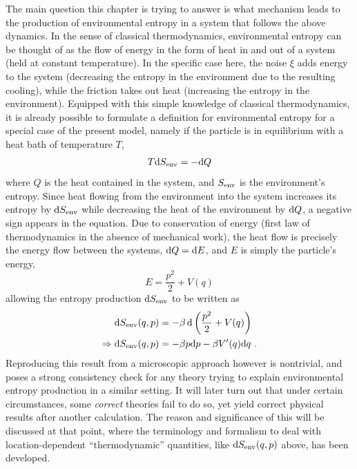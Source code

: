 The main question this chapter is trying to answer is what mechanism leads to the production of environmental entropy in a system that follows the above dynamics. In the sense of classical thermodynamics, environmental entropy can be thought of as the flow of energy in the form of heat in and out of a system (held at constant temperature). In the specific case here, the noise \(\xi\) adds energy to the system (decreasing the entropy in the environment due to the resulting cooling), while the friction takes out heat (increasing the entropy in the environment). Equipped with this simple knowledge of classical thermodynamics, it is already possible to formulate a definition for environmental entropy for a special case of the present model, namely if the particle is in equilibrium with a heat bath of temperature \(T\),
%
\begin{equation} T\mathrm{d}S_\text{env} = -\mathrm{d} Q \end{equation}
%
where \(Q\) is the heat contained in the system, and \(S_\text{env}\) is the environment's entropy. Since heat flowing from the environment into the system increases its entropy by \(\mathrm{d}S_\text{env}\) while decreasing the heat of the environment by \(\mathrm{d} Q\), a negative sign appears in the equation. Due to conservation of energy (first law of thermodynamics in the absence of mechanical work), the heat flow is precisely the energy flow between the systems, \(\mathrm{d} Q = \mathrm{d} E\), and \(E\) is simply the particle's energy,
%
\begin{equation} E = \frac{p^2}2 + V(q) \end{equation}
%
allowing the entropy production \(\mathrm{d}S_\text{env}\) to be written as
%
\begin{align}
	\mathrm{d}S_\text{env}(q,p) &= -\beta\,\mathrm{d}\left(\frac{p^2}2 + V(q)\right) \notag \\
	\Rightarrow \mathrm{d}S_\text{env}(q,p) &= -\beta p\mathrm{d} p - \beta V'(q)\mathrm{d} q ~.
	\label{eqn:classical environmental entropy production}
\end{align}
%
Reproducing this result from a microscopic approach however is nontrivial, and poses a strong consistency check for any theory trying to explain environmental entropy production in a similar setting. It will later turn out that under certain circumstances, some \emph{correct} theories fail to do so, yet yield correct physical results after another calculation. The reason and significance of this will be discussed at that point, where the terminology and formalism to deal with location-dependent ``thermodynamic'' quantities, like \(\mathrm{d}S_\text{env}(q,p)\) above, has been developed.






